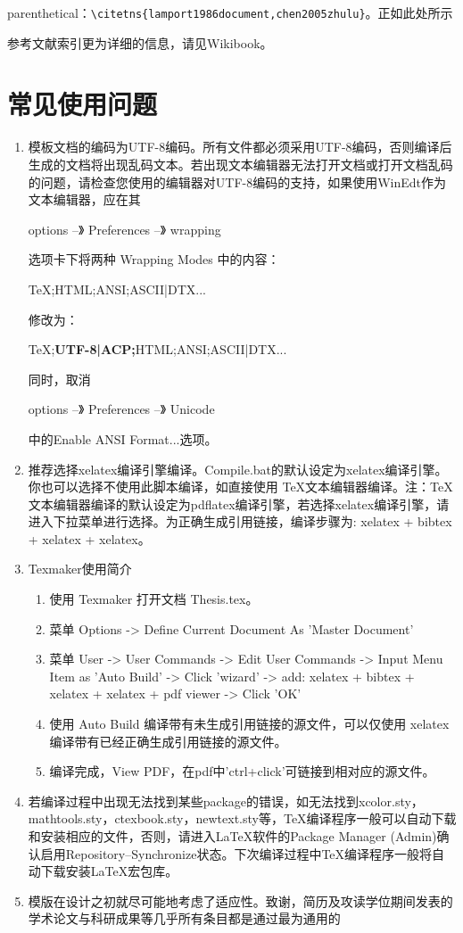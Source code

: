 parenthetical：\verb|\citetns{lamport1986document,chen2005zhulu}|。正如此处所示\cite{lamport1986document,chen2005zhulu}

参考文献索引更为详细的信息，请见Wikibook\cite{wikibook2014latex}。

\section{常见使用问题}

\begin{enumerate}
  \item 模板文档的编码为UTF-8编码。所有文件都必须采用UTF-8编码，否则编译后生成的文档将出现乱码文本。若出现文本编辑器无法打开文档或打开文档乱码的问题，请检查您使用的编辑器对UTF-8编码的支持，如果使用WinEdt作为文本编辑器，应在其

  options --》 Preferences --》 wrapping

  选项卡下将两种 Wrapping Modes 中的内容：

  TeX;HTML;ANSI;ASCII|DTX...

  修改为：

  TeX;\textbf{UTF-8|ACP;}HTML;ANSI;ASCII|DTX...

  同时，取消

  options --》 Preferences --》 Unicode

  中的Enable ANSI Format...选项。
  \item 推荐选择xelatex编译引擎编译。Compile.bat的默认设定为xelatex编译引擎。你也可以选择不使用此脚本编译，如直接使用 \TeX{}文本编辑器编译。注：\TeX{}文本编辑器编译的默认设定为pdflatex编译引擎，若选择xelatex编译引擎，请进入下拉菜单进行选择。为正确生成引用链接，编译步骤为: xelatex + bibtex + xelatex + xelatex。
  \item Texmaker使用简介
      \begin{enumerate}
          \item 使用 Texmaker 打开文档 Thesis.tex。
          \item 菜单 Options -> Define Current Document As 'Master Document'
          \item 菜单 User -> User Commands -> Edit User Commands -> Input Menu Item as 'Auto Build' -> Click 'wizard' -> add: xelatex + bibtex + xelatex + xelatex + pdf viewer -> Click 'OK'
          \item 使用 Auto Build 编译带有未生成引用链接的源文件，可以仅使用 xelatex 编译带有已经正确生成引用链接的源文件。
          \item 编译完成，View PDF，在pdf中'ctrl+click'可链接到相对应的源文件。
      \end{enumerate}
  \item 若编译过程中出现无法找到某些package的错误，如无法找到xcolor.sty，mathtools.sty，ctexbook.sty，newtext.sty等，\TeX{}编译程序一般可以自动下载和安装相应的文件，否则，请进入\LaTeX{}软件的Package Manager (Admin)确认启用Repository--Synchronize状态。下次编译过程中\TeX{}编译程序一般将自动下载安装\LaTeX{}宏包库。
  \item 模版在设计之初就尽可能地考虑了适应性。致谢，简历及攻读学位期间发表的学术论文与科研成果等几乎所有条目都是通过最为通用的
       

\end{enumerate}
